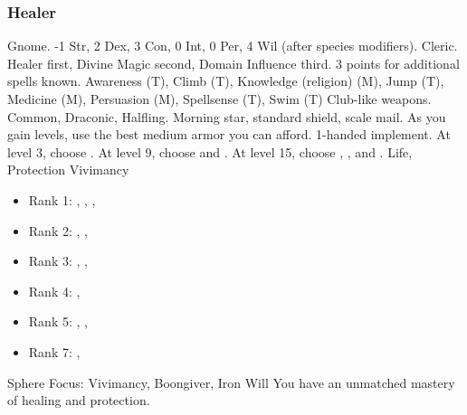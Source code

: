         \subsubsection{Healer}
             Gnome.
             -1 Str, 2 Dex, 3 Con, 0 Int, 0 Per, 4 Wil (after species modifiers).
             Cleric.
             Healer first, Divine Magic second, Domain Influence third.
             3 points for additional spells known.
             Awareness (T), Climb (T), Knowledge (religion) (M), Jump (T), Medicine (M), Persuasion (M), Spellsense (T), Swim (T)
             Club-like weapons.
             Common, Draconic, Halfling.
             Morning star, standard shield, scale mail. As you gain levels, use the best medium armor you can afford.
             1-handed implement.
                At level 3, choose .
                At level 9, choose  and .
                At level 15, choose , , and .
             Life, Protection
             Vivimancy
            \begin{itemize}
                \item Rank 1: , , , 
                \item Rank 2: , , 
                \item Rank 3: , , 
                \item Rank 4: , 
                \item Rank 5: , , 
                \item Rank 7: , 
            \end{itemize}
             Sphere Focus: Vivimancy, Boongiver, Iron Will
             You have an unmatched mastery of healing and protection.
